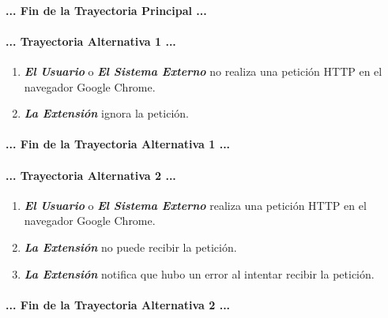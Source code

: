 \documentclass[12pt, a4paper, titlepage]{article}
\begin{document}
				\paragraph{... Fin de la Trayectoria Principal ...}
				
				\paragraph{... Trayectoria Alternativa 1 ...}
				\begin{enumerate}
					\item \textbf{\textit{El Usuario}} o \textbf{\textit{El Sistema Externo}} no realiza una petición HTTP en el navegador Google Chrome.\\
					\item \textbf{\textit{La Extensión}} ignora la petición.					
				\end{enumerate}
				\paragraph{... Fin de la Trayectoria Alternativa 1 ...}
				
				\paragraph{... Trayectoria Alternativa 2 ...}
				\begin{enumerate}
					\item \textbf{\textit{El Usuario}} o \textbf{\textit{El Sistema Externo}} realiza una petición HTTP en el navegador Google Chrome.\\
					\item \textbf{\textit{La Extensión}} no puede recibir la petición.\\
					\item \textbf{\textit{La Extensión}} notifica que hubo un error al intentar recibir la petición. 
				\end{enumerate}
				\paragraph{... Fin de la Trayectoria Alternativa 2 ...}
				\newpage
				
\end{document}
